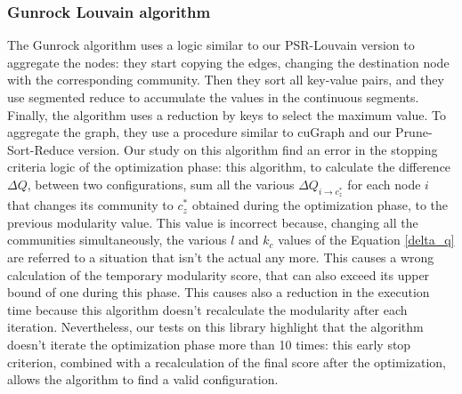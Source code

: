 \subsubsection{Gunrock Louvain algorithm}
The Gunrock algorithm uses a logic similar to our PSR-Louvain version to aggregate the nodes: they start copying the edges, changing the destination node with the corresponding community. Then they sort all key-value pairs, and they use segmented reduce to accumulate the values in the continuous segments. Finally, the algorithm uses a reduction by keys to select the maximum value. To aggregate the graph, they use a procedure similar to cuGraph and our Prune-Sort-Reduce version. Our study on this algorithm find an error in the stopping criteria logic of the optimization phase: this algorithm, to calculate the difference $\Delta Q$, between two configurations, sum all the various $\Delta Q_{i \rightarrow c_z^*}$ for each node $i$ that changes its community to $c_z^*$ obtained during the optimization phase, to the previous modularity value. This value is incorrect because, changing all the communities simultaneously, the various $l$ and $k_c$ values of the Equation \ref{delta_q} are referred to a situation that isn't the actual any more. This causes a wrong calculation of the temporary modularity score, that can also exceed its upper bound of one during this phase. This causes also a reduction in the execution time because this algorithm doesn't recalculate the modularity after each iteration.
Nevertheless, our tests on this library highlight that the algorithm doesn't iterate the optimization phase more than 10 times: this early stop criterion, combined with a recalculation of the final score after the optimization, allows the algorithm to find a valid configuration.
\newpage
